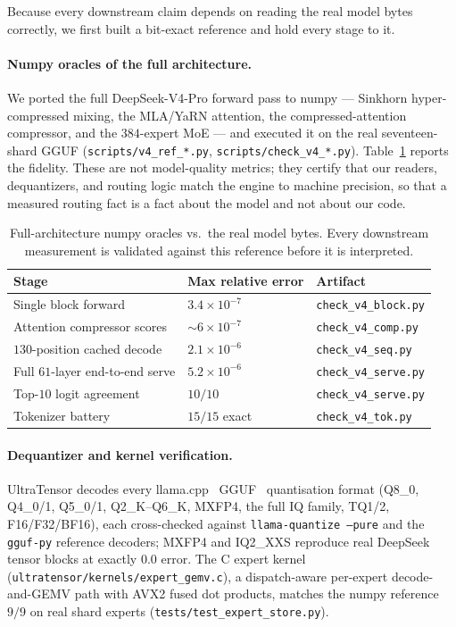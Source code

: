 \documentclass[11pt]{article}
\newcommand{\code}[1]{\texttt{#1}}
\begin{document}
Because every downstream claim depends on reading the real model bytes
correctly, we first built a bit-exact reference and hold every stage to it.

\paragraph{Numpy oracles of the full architecture.}
We ported the full DeepSeek-V4-Pro forward pass to numpy --- Sinkhorn
hyper-compressed mixing, the MLA/YaRN attention, the compressed-attention
compressor, and the $384$-expert MoE --- and executed it on the real
seventeen-shard GGUF (\code{scripts/v4\_ref\_*.py}, \code{scripts/check\_v4\_*.py}).
Table~\ref{tab:oracles} reports the fidelity. These are not model-quality
metrics; they certify that our readers, dequantizers, and routing logic match
the engine to machine precision, so that a measured routing fact is a fact about
the model and not about our code.

\begin{table}[t]
\centering
\small
\begin{tabular}{lll}
\toprule
\textbf{Stage} & \textbf{Max relative error} & \textbf{Artifact} \\
\midrule
Single block forward            & $3.4\times10^{-7}$ & \code{check\_v4\_block.py} \\
Attention compressor scores     & ${\sim}6\times10^{-7}$ & \code{check\_v4\_comp.py} \\
$130$-position cached decode     & $2.1\times10^{-6}$ & \code{check\_v4\_seq.py} \\
Full $61$-layer end-to-end serve & $5.2\times10^{-6}$ & \code{check\_v4\_serve.py} \\
Top-$10$ logit agreement        & $10/10$ & \code{check\_v4\_serve.py} \\
Tokenizer battery               & $15/15$ exact & \code{check\_v4\_tok.py} \\
\bottomrule
\end{tabular}
\caption{Full-architecture numpy oracles vs.\ the real model bytes. Every
downstream measurement is validated against this reference before it is
interpreted.}
\label{tab:oracles}
\end{table}

\paragraph{Dequantizer and kernel verification.}
UltraTensor decodes every llama.cpp~\cite{llamacpp} GGUF~\cite{gguf} quantisation
format (Q8\_0, Q4\_0/1, Q5\_0/1, Q2\_K--Q6\_K, MXFP4, the full IQ family, TQ1/2,
F16/F32/BF16), each cross-checked against \code{llama-quantize --pure} and the
\code{gguf-py} reference decoders; MXFP4 and IQ2\_XXS reproduce real DeepSeek
tensor blocks at exactly $0.0$ error. The C expert kernel
(\code{ultratensor/kernels/expert\_gemv.c}), a dispatch-aware per-expert
decode-and-GEMV path with AVX2 fused dot products, matches the numpy reference
$9/9$ on real shard experts (\code{tests/test\_expert\_store.py}).
\end{document}
